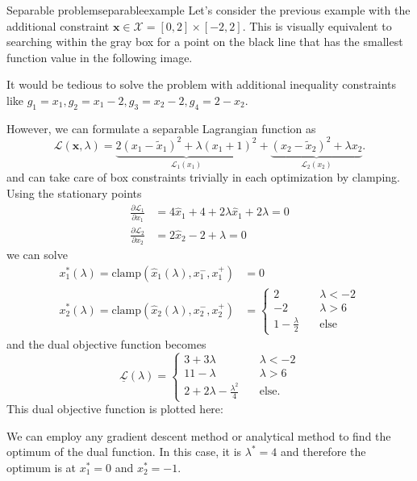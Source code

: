 \begin{example}{Separable problem}{separableexample}
    Let's consider the previous example with the additional constraint $\mathbf{x} \in \mathcal{X} = [0, 2]\times[-2, 2]$.
    This is visually equivalent to searching within the gray box for a point on the black line that has the smallest function value in the following image.
    \begin{center}
        
    \end{center}

    It would be tedious to solve the problem with additional inequality constraints like $g_1= x_1, g_2=x_1-2, g_3=x_2-2, g_4=2-x_2$. 

    However, we can formulate a separable Lagrangian function as
    \begin{equation}
        \mathcal{L}(\mathbf{x}, \lambda) = \underbrace{2 (x_1-\tilde{x}_1)^2 + \lambda (x_1+1)^2}_{\mathcal{L}_1(x_1)} + \underbrace{(x_2-\tilde{x}_2)^2  + \lambda x_2}_{\mathcal{L}_2(x_2)}.
    \end{equation}
    and can take care of box constraints trivially in each optimization by clamping. Using the stationary points 
    \begin{align}
        \frac{\partial \mathcal{L}_1}{\partial x_1} &= 4\hat{x}_1+4+2\lambda \hat{x}_1 + 2 \lambda = 0 \\
        \frac{\partial \mathcal{L}_2}{\partial x_2} &= 2\hat{x}_2-2+\lambda = 0
    \end{align}
    we can solve 
    \begin{align}
        x_1^*(\lambda) = \textrm{clamp}(\hat{x}_1(\lambda), x_1^-, x_1^+) &= 0 \\
        x_2^*(\lambda) = \textrm{clamp}(\hat{x}_2(\lambda), x_2^-, x_2^+) &= 
        \begin{cases}
            2 & \quad \lambda < -2 \\
            -2 & \quad \lambda > 6 \\
            1 - \frac{\lambda}{2} & \quad \text{else}
        \end{cases}
    \end{align}
    and the dual objective function becomes 
    \begin{equation}
        \underline{\mathcal{L}}(\lambda) = 
        \begin{cases}
            3 + 3 \lambda  & \quad \lambda < -2 \\
            11 - \lambda  & \quad \lambda > 6 \\
            2 + 2 \lambda - \frac{\lambda^2}{4}   & \quad \text{else.}
        \end{cases}
    \end{equation}
    This dual objective function is plotted here:
    \begin{center}
        
    \end{center}
    We can employ any gradient descent method or analytical method to find the optimum of the dual function. In this case, it is $\lambda^*=4$ and therefore the optimum is at $x_1^*=0$ and $x_2^*=-1$.    
\end{example}


 